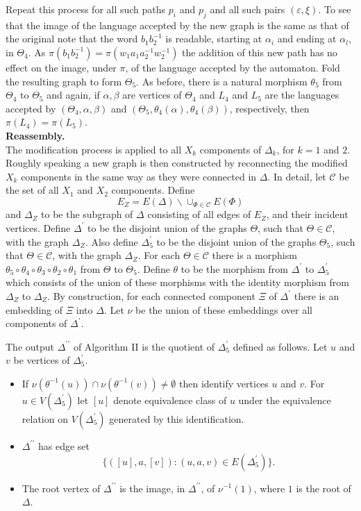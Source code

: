 \documentclass[a4paper,12pt]{article}
\renewcommand{\a}{\alpha }
\renewcommand{\b}{\beta }
\newcommand{\D}{\Delta }
\newcommand{\e}{\varepsilon }
\newcommand{\T}{\Theta }
\newcommand{\nul}{\emptyset }
\numberwithin{equation}{section}
\numberwithin{figure}{section}
\newcommand{\cC}{\mathcal{C}}
\newcommand{\bs}{\backslash}
\begin{document}
Repeat this process for all such paths $p_i$ and $p_j$ and all such
pairs $(\e,\xi)$.
To see that the image of the language accepted by
 the new graph is the same as that of the original note
that the word $b_1b_2^{-1}$ is readable, starting at $\a_i$ and
ending at $\a_l$, in $\T_4$. As $\pi(b_1b_2^{-1})=\pi(w_1a_1a_2^{-1}w_2^{-1})$
the addition of this new path has no effect on the image, under $\pi$, of
the language accepted by the automaton.
 Fold the resulting graph to form $\T_5$. As before, there is
a natural morphism $\theta_5$ from $\Theta_4$ to $\Theta_5$ and again,
if $\a,\b$ are
vertices of $\Theta_4$ and $L_4$ and $L_5$ are the languages accepted by
$(\Theta_4,\a,\b)$ and $(\Theta_5,\theta_4(\a),\theta_4(\b))$,
respectively, then $\pi(L_4)=\pi(L_5)$.\\[1em]

\noindent\textbf{Reassembly.}\\
The modification process is applied to all $X_k$ components of $\D_k$,
for $k=1$ and $2$. Roughly speaking a new graph is then constructed by
reconnecting the modified $X_k$ components in the same way as they
were connected in $\D$. In detail,
let $\cC$ be the set of all
$X_1$ and $X_2$ components.
Define
\[E_Z=E(\D)\bs \cup_{\Phi\in \cC} E(\Phi)\]
and $\D_Z$ to be the subgraph of $\D$ consisting of all edges
of $E_Z$, and their incident vertices.
Define $\D^\prime$ to be the disjoint union of the
 graphs $\T$, such that $\T\in \cC$, with  the graph $\D_Z$.
Also define $\D^{\prime}_5$ to be the disjoint union of the graphs
$\T_5$, such that $\T\in \cC$, with the graph $\D_Z$. For each
$\T\in \cC$ there is  a morphism
$\theta_5\circ\theta_4\circ\theta_3\circ\theta_2\circ\theta_1$
from $\T$ to $\T_5$. Define $\theta$ to be the morphism from
$\D^\prime$ to $\D^\prime_5$ which consists of the union of these
morphisms with the identity morphism from $\D_Z$ to $\D_Z$. By
construction, for each connected component $\Xi$ of $\D^\prime$
there is an embedding of $\Xi$ into $\D$. Let $\nu$ be the union
of these embeddings over all components of $\D^\prime$.

The output $\D^{\prime\prime}$  of Algorithm II is the quotient of
 $\D^\prime_5$ defined as follows.
Let $u$ and $v$ be vertices
 of $\D^\prime_5$.
\begin{itemize}
\item If $\nu(\theta^{-1}(u))\cap \nu(\theta^{-1}(v))\neq \nul$ then
identify vertices $u$ and $v$.
For $u \in V(\D^\prime_5)$ let
$[u]$  denote equivalence class of $u$ under the equivalence relation
on $V(\D^\prime_5)$ generated by this identification.
\item
$\D^{\prime\prime}$ has edge set
\[\{([u],a,[v]): (u,a,v)\in E(\D^\prime_5)\}.\]
\item The root vertex of $\D^{\prime\prime}$ is the image, in
$\D^{\prime\prime}$, of $\nu^{-1}(1)$, where $1$ is  the root of
$\D$.
\end{itemize}
\end{document}
